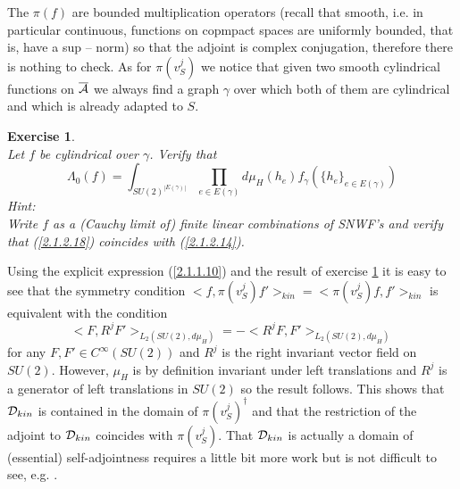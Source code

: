 \documentclass[12pt]{report}
\newtheorem{Exercise}{Exercise}[section]
\def\be{\begin{equation}}
\def\ee{\end{equation}}
\def\a{{\cal A}}
\def\ab{\overline{\a}}
\begin{document}
The $\pi(f)$ are bounded multiplication operators (recall that smooth, 
i.e. in particular continuous, functions on copmpact spaces are uniformly
bounded, that is, have a sup -- norm) so that the adjoint is 
complex conjugation, therefore there is nothing to check. As for 
$\pi(v_S^j)$ we notice that given two smooth cylindrical functions 
on $\ab$ we always find a graph $\gamma$ over which both of them are 
cylindrical and which is already adapted to $S$. 
%
\begin{Exercise} \label{ex2.1.2.5} ~~~\\
Let $f$ be cylindrical over $\gamma$. Verify that 
\be \label{2.1.2.18}
\Lambda_0(f)=\int_{SU(2)^{|E(\gamma)|}} \prod_{e\in E(\gamma)} d\mu_H(h_e)
f_\gamma(\{h_e\}_{e\in E(\gamma)})
\ee
Hint:\\
Write $f$ as a (Cauchy limit of) finite linear combinations of SNWF's
and verify that (\ref{2.1.2.18}) coincides with    
(\ref{2.1.2.14}).
\end{Exercise}
%
Using the explicit expression (\ref{2.1.1.10}) and the result of 
exercise \ref{ex2.1.2.5} it is easy to see that 
the symmetry condition $<f,\pi(v_S^j)f'>_{kin}=<\pi(v_S^j) f,f'>_{kin}$
is equivalent with the condition
\be \label{2.1.2.19} 
<F,R^j F'>_{L_2(SU(2),d\mu_H)}
=-<R^j F, F'>_{L_2(SU(2),d\mu_H)}
\ee
for any $F,F'\in C^\infty(SU(2))$ and $R^j$ is the right invariant vector 
field on $SU(2)$. However, $\mu_H$ is by definition 
invariant under left translations and $R^j$ is a generator of left 
translations in $SU(2)$ so the result follows. This shows that 
${\cal D}_{kin}$ is contained in the domain of $\pi(v_S^j)^\dagger$
and that the restriction of the adjoint to ${\cal D}_{kin}$ coincides
with $\pi(v_S^j)$. That ${\cal D}_{kin}$ is actually a domain of 
(essential) self-adjointness requires a little bit more work but is 
not difficult to see, e.g. \cite{0}. 
\end{document}
